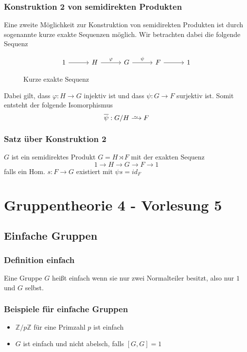 \documentclass[12pt, german]{article}
\newcommand\iso{\xrightarrow{
		\,\smash{\raisebox{-0.65ex}{\ensuremath{\scriptstyle\sim}}}\,}}
\begin{document}
	\subsubsection{Konstruktion 2 von semidirekten Produkten}
	Eine zweite Möglichkeit zur Konstruktion von semidirekten Produkten ist durch sogenannte kurze exakte Sequenzen möglich. 
	Wir betrachten dabei die folgende Sequenz
	\begin{figure}[h!]
		\centering
		\begin{equation*}
			\begin{tikzcd}[column sep=2.5pc]
				1 \arrow{r}{} & H \arrow{r}{\varphi} & G \arrow{r}{\psi} & F \arrow{r}{} & 1
			\end{tikzcd}
		\end{equation*}
		\caption{Kurze exakte Sequenz}
	\end{figure} 
	
	Dabei gilt, dass $\varphi : H \to G$ injektiv ist und dass $\psi : G \to F$ surjektiv ist. Somit entsteht der folgende Isomorphismus $$\overline{\psi} : G/H \iso F$$
	
	\subsubsection{Satz über Konstruktion 2}
	$G$ ist ein semidirektes Produkt $G = H\rtimes F$ mit der exakten Sequenz $$1 \to H \to G \to F \to 1$$ falls ein Hom. $s: F \to G$ existiert  mit $\psi s = id_F$
	
	\section{Gruppentheorie 4 - Vorlesung 5}
	\subsection{Einfache Gruppen}
	\subsubsection{Definition einfach}
	Eine Gruppe $G$ heißt einfach wenn sie nur zwei Normalteiler besitzt, also nur $1$ und $G$ selbst.
	
	\subsubsection{Beispiele für einfache Gruppen}
	\begin{itemize}
		\item $\mathbb Z / p \mathbb Z$ für eine Primzahl $p$ ist einfach 
		\item $G$ ist einfach und nicht abelsch, falls $[G, G] =1$
	\end{itemize}
	
\end{document}
